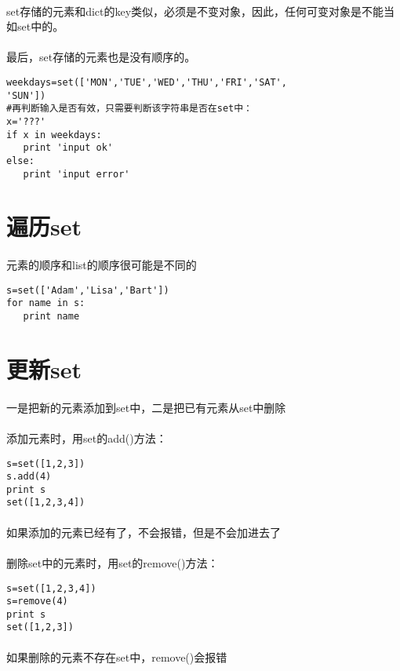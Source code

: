 \documentclass{article}
\begin{document}
\begin{CJK}{UTF8}{gbsn}
\paragraph{}
set存储的元素和dict的key类似，必须是不变对象，因此，任何可变对象是不能当如set中的。
\paragraph{}
最后，set存储的元素也是没有顺序的。
\begin{verbatim}
weekdays=set(['MON','TUE','WED','THU','FRI','SAT',
'SUN'])
#再判断输入是否有效，只需要判断该字符串是否在set中：
x='???'
if x in weekdays:
   print 'input ok'
else:
   print 'input error'
\end{verbatim}
\section{遍历set}
\paragraph{}
元素的顺序和list的顺序很可能是不同的
\begin{verbatim}
s=set(['Adam','Lisa','Bart'])
for name in s:
   print name
\end{verbatim}
\section{更新set}
\paragraph{}
一是把新的元素添加到set中，二是把已有元素从set中删除
\paragraph{}
添加元素时，用set的add()方法：
\begin{verbatim}
s=set([1,2,3])
s.add(4)
print s
set([1,2,3,4])
\end{verbatim}
\paragraph{}
如果添加的元素已经有了，不会报错，但是不会加进去了
\paragraph{}
删除set中的元素时，用set的remove()方法：
\begin{verbatim}
s=set([1,2,3,4])
s=remove(4)
print s
set([1,2,3])
\end{verbatim}
\paragraph{}
如果删除的元素不存在set中，remove()会报错
\end{CJK}
\end{document}

